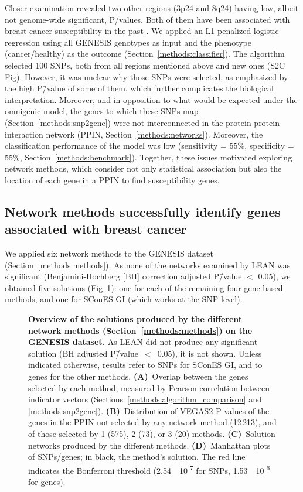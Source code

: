 \documentclass[10pt,letterpaper]{article}
\begin{document}
Closer examination revealed two other regions (3p24 and 8q24) having low, albeit not genome-wide significant, P\=/values. Both of them have been associated with breast cancer susceptibility in the past \cite{brisbin_meta-analysis_2011,search_newly_2009}. We applied an L1-penalized logistic regression using all GENESIS genotypes as input and the phenotype (cancer/healthy) as the outcome (Section~\ref{methods:classifier}). The algorithm selected 100 SNPs, both from all regions mentioned above and new ones (S2C Fig). However, it was unclear why those SNPs were selected, as emphasized by the high P\=/value of some of them, which further complicates the biological interpretation. Moreover, and in opposition to what would be expected under the omnigenic model, the genes to which these SNPs map (Section~\ref{methods:snp2gene}) were not interconnected in the protein-protein interaction network (PPIN, Section~\ref{methods:networks}). Moreover, the classification performance of the model was low (sensitivity = 55\%, specificity = 55\%, Section~\ref{methods:benchmark}). Together, these issues motivated exploring network methods, which consider not only statistical association but also the location of each gene in a PPIN to find susceptibility genes.

\subsection{Network methods successfully identify genes associated with breast cancer}
\label{results:separate_networks}

We applied six network methods to the GENESIS dataset (Section~\ref{methods:methods}). As none of the networks examined by LEAN was significant (Benjamini-Hochberg [BH] correction adjusted P\=/value $<$ 0.05), we obtained five solutions (Fig~\ref{fig:solution_overview}): one for each of the remaining four gene-based methods, and one for SConES GI (which works at the SNP level).

\begin{figure}[!ht]
  \centering
  \caption{\textbf{Overview of the solutions produced by the different network methods (Section~\ref{methods:methods}) on the GENESIS dataset.} As LEAN did not produce any significant solution (BH adjusted P\=/value~$<$~0.05), it is not shown. Unless indicated otherwise, results refer to SNPs for SConES GI, and to genes for the other methods. \textbf{(A)}~Overlap between the genes selected by each method, measured by Pearson correlation between indicator vectors (Sections~\ref{methods:algorithm_comparison} and \ref{methods:snp2gene}). \textbf{(B)}~Distribution of VEGAS2 P-values of the genes in the PPIN not selected by any network method (12\,213), and of those selected by 1 (575), 2 (73), or 3 (20) methods. \textbf{(C)}~Solution networks produced by the different methods. \textbf{(D)}~Manhattan plots of SNPs/genes; in black, the method's solution. The red line indicates the Bonferroni threshold (2.54~\texttimes{}~10\textsuperscript{-7} for SNPs, 1.53~\texttimes{}~10\textsuperscript{-6} for genes).}
  \label{fig:solution_overview}
\end{figure}
\end{document}
